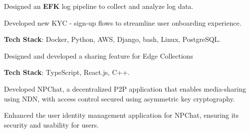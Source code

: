 \documentclass[letterpaper]{deedy-resume} %
\begin{document}
\begin{minipage}[t]{0.66\textwidth}
\sectionspace %


\begin{tightitemize}
\item Designed an \textbf{EFK} log pipeline to collect and analyze log data.
\item Developed new KYC - sign-up flows to streamline user onboarding experience.
\item \textbf{Tech Stack}: Docker, Python, AWS, Django, bash, Linux, PostgreSQL.
\end{tightitemize}

\sectionspace %


\begin{tightitemize}
\item Designed and developed a sharing feature for Edge Collections
\item \textbf{Tech Stack}: TypeScript, React.js, C++.
\end{tightitemize}

\sectionspace %

\begin{tightitemize}
\item Developed NPChat, a decentralized P2P application that enables media-sharing using NDN, with access control secured using asymmetric key cryptography.
\item Enhanced the user identity management application for NPChat, ensuring its security and usability for users.
\end{tightitemize}


\end{minipage}
\end{document}

